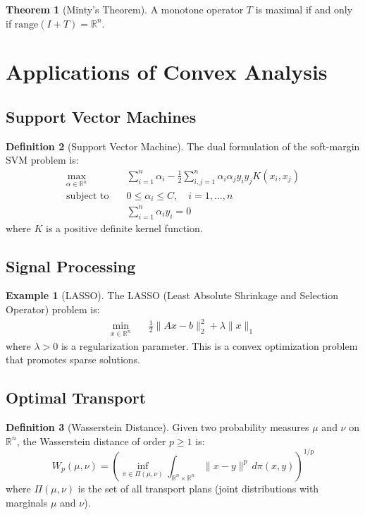 \documentclass[12pt,a4paper]{article}
\theoremstyle{definition}
\newtheorem{theorem}{Theorem}[section]
\newtheorem{definition}[theorem]{Definition}
\newtheorem{example}{Example}[section]
\begin{document}
\begin{theorem}[Minty's Theorem]
A monotone operator $T$ is maximal if and only if $\text{range}(I + T) = \mathbb{R}^n$.
\end{theorem}

\section{Applications of Convex Analysis}

\subsection{Support Vector Machines}

\begin{definition}[Support Vector Machine]
The dual formulation of the soft-margin SVM problem is:
\begin{align}
\max_{\alpha \in \mathbb{R}^n} &\quad \sum_{i=1}^n \alpha_i - \frac{1}{2}\sum_{i,j=1}^n \alpha_i \alpha_j y_i y_j K(x_i, x_j)\\
\text{subject to} &\quad 0 \leq \alpha_i \leq C, \quad i = 1, \ldots, n\\
&\quad \sum_{i=1}^n \alpha_i y_i = 0
\end{align}
where $K$ is a positive definite kernel function.
\end{definition}

\subsection{Signal Processing}

\begin{example}[LASSO]
The LASSO (Least Absolute Shrinkage and Selection Operator) problem is:
\begin{align}
\min_{x \in \mathbb{R}^n} &\quad \frac{1}{2}\|Ax - b\|_2^2 + \lambda\|x\|_1
\end{align}
where $\lambda > 0$ is a regularization parameter. This is a convex optimization problem that promotes sparse solutions.
\end{example}

\subsection{Optimal Transport}

\begin{definition}[Wasserstein Distance]
Given two probability measures $\mu$ and $\nu$ on $\mathbb{R}^n$, the Wasserstein distance of order $p \geq 1$ is:
\[W_p(\mu, \nu) = \left(\inf_{\pi \in \Pi(\mu, \nu)} \int_{\mathbb{R}^n \times \mathbb{R}^n} \|x - y\|^p \, d\pi(x, y)\right)^{1/p}\]
where $\Pi(\mu, \nu)$ is the set of all transport plans (joint distributions with marginals $\mu$ and $\nu$).
\end{definition}
\end{document}
